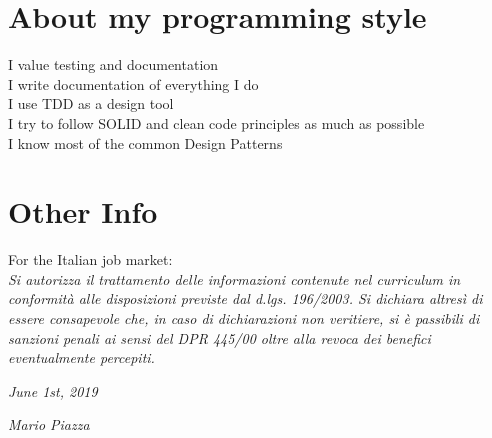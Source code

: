 \documentclass[]{friggeri-cv}
\begin{document}
\section{About my programming style}
I value testing and documentation\\
I write documentation of everything I do\\
I use TDD as a design tool\\
I try to follow SOLID and clean code principles as much as possible\\
I know most of the common Design Patterns\\

\section{Other Info}
For the Italian job market:\\
\emph{Si autorizza il trattamento delle informazioni contenute nel curriculum in conformità alle disposizioni previste dal d.lgs. 196/2003. Si dichiara altresì di essere consapevole che, in caso di dichiarazioni non veritiere, si è passibili di sanzioni penali ai sensi del DPR 445/00 oltre alla revoca dei benefici eventualmente percepiti.}
\\
\begin{flushleft}
\emph{June 1st, 2019}
\end{flushleft}
\begin{flushright}
\emph{Mario Piazza}
\end{flushright}
\end{document}
